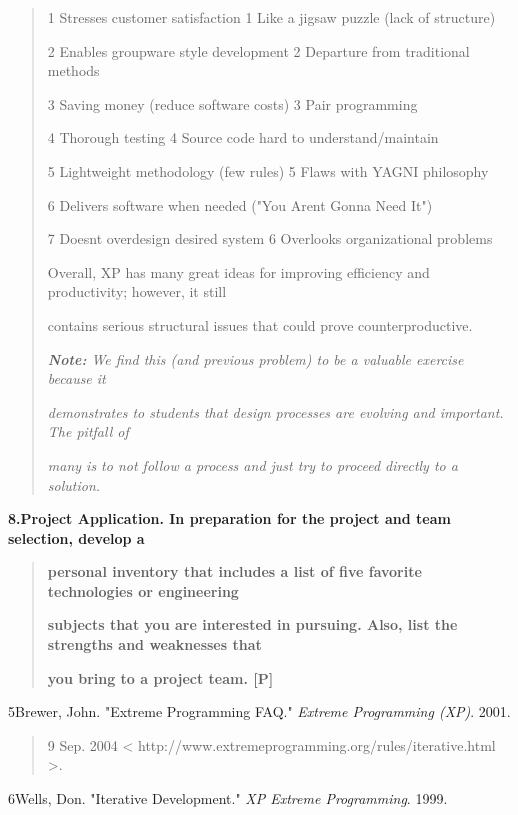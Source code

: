 \documentclass[
]{article}
\begin{document}
\begin{quote}
1 Stresses customer satisfaction 1 Like a jigsaw puzzle (lack of
structure)

2 Enables groupware style development 2 Departure from traditional
methods

3 Saving money (reduce software costs) 3 Pair programming

4 Thorough testing 4 Source code hard to understand/maintain

5 Lightweight methodology (few rules) 5 Flaws with YAGNI philosophy

6 Delivers software when needed ("You Aren\textquotesingle t Gonna Need
It")

7 Doesn\textquotesingle t overdesign desired system 6 Overlooks
organizational problems

Overall, XP has many great ideas for improving efficiency and
productivity; however, it still

contains serious structural issues that could prove counterproductive.

\emph{\textbf{Note:} We find this (and previous problem) to be a
valuable exercise because it}

\emph{demonstrates to students that design processes are evolving and
important. The pitfall of}

\emph{many is to not follow a process and just try to proceed directly
to a solution.}
\end{quote}

\textbf{8.Project Application. In preparation for the project and team
selection, develop a}

\begin{quote}
\textbf{personal inventory that includes a list of five favorite
technologies or engineering}

\textbf{subjects that you are interested in pursuing. Also, list the
strengths and weaknesses that}

\textbf{you bring to a project team. {[}P{]}}
\end{quote}

5Brewer, John. "Extreme Programming FAQ." \emph{Extreme Programming
(XP)}. 2001.

\begin{quote}
9 Sep. 2004 \textless{}
http://www.extremeprogramming.org/rules/iterative.html \textgreater.
\end{quote}

6Wells, Don. "Iterative Development." \emph{XP Extreme Programming}.
1999.
\end{document}
